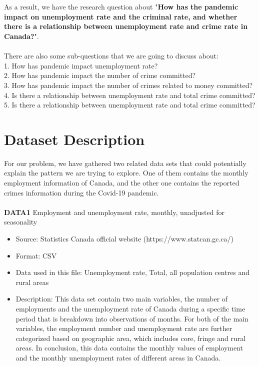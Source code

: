 \documentclass[fontsize=11pt]{article}
\begin{document}
\\
\hspace*{\fill}\\
As a result, we have the research question about "\textbf{How has the pandemic impact on unemployment rate and the criminal rate, and whether there is a relationship between unemployment rate and crime rate in Canada?}".
\\
\hspace*{\fill}\\
There are also some sub-questions that we are going to discuss about:\\
1. How has pandemic impact unemployment rate?\\
2. How has pandemic impact the number of crime committed?\\
3. How has pandemic impact the number of crimes related to money committed?\\
4. Is there a relationship between unemployment rate and total crime committed?\\
5. Is there a relationship between unemployment rate and total crime committed?




\section*{Dataset Description}
For our problem, we have gathered two related data sets that could potentially explain the pattern we are trying to explore. One of them contains the monthly employment information of Canada, and the other one contains the reported crimes information during the Covid-19 pandemic. \\
\\
\textbf{DATA1} Employment and unemployment rate, monthly, unadjusted for seasonality
\begin{itemize}
\item Source: Statistics Canada official website (https://www.statcan.gc.ca/)
\item Format: CSV
\item Data used in this file: Unemployment rate, Total, all population centres and rural areas
\item Description: This data set contain two main variables, the number of employments and the unemployment rate of Canada during a specific time period that is breakdown into observations of months. For both of the main variables, the employment number and unemployment rate are further categorized based on geographic area, which includes core, fringe and rural areas.
In conclusion, this data contains the monthly values of employment and the monthly unemployment rates of different areas in Canada. 

\end{itemize}
\end{document}

